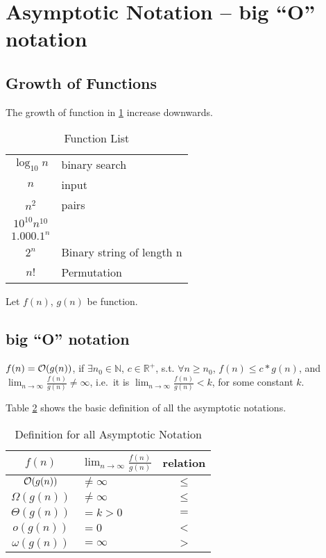 
\section{Asymptotic Notation -- big ``O'' notation}

\subsection{Growth of Functions}

The growth of function in \cref{function_list} increase downwards.
\begin{table}[H]
\centering
\caption{Function List}\label{function_list}
\begin{tabular}{c|l}
$\log_{10} n$ & binary search \\
$n$ & input \\
$n^2$ & pairs \\
$10^{10}n^{10}$ & \\
$1.000.1^n$ & \\
$2^n$ & Binary string of length n \\
$n!$ & Permutation \\
\end{tabular}
\end{table}
Let $f(n)$, $g(n)$ be function.

\subsection{big ``O'' notation}
\begin{definition}

$f(n) = \mathcal{O}(g(n))$, if $\exists n_0 \in \mathbb{N}$,
$c \in \mathbb{R}^+$, s.t. $\forall n \geq n_0$, $f(n) \leq c * g(n)$,
and $\lim_{n \rightarrow \infty} \frac{f(n)}{g(n)} \ne \infty$, i.e.\ it is $\lim_{n \rightarrow \infty} \frac{f(n)}{g(n)} < k$, for some constant $k$.
\end{definition}

Table \ref{def_asymptotic_notation} shows the basic definition of all the asymptotic notations.
\begin{table}[H]
\centering
\caption{Definition for all Asymptotic Notation}\label{def_asymptotic_notation}
\begin{tabular}{c|l|c}
\hline
$f(n)$ & $\lim_{n \rightarrow \infty} \frac{f(n)}{g(n)}$ & relation \\
\hline
\hline
$\mathcal{O}(g(n))$ & $\neq \infty$ & $\leq$ \\
$\Omega(g(n))$  & $\neq \infty$ & $\leq$  \\
$\Theta(g(n))$  & $= k > 0$ & $=$  \\
$o(g(n))$  & $= 0$ & $<$  \\
$\omega(g(n))$  & $= \infty$ & $>$  \\
\end{tabular}
\end{table}


